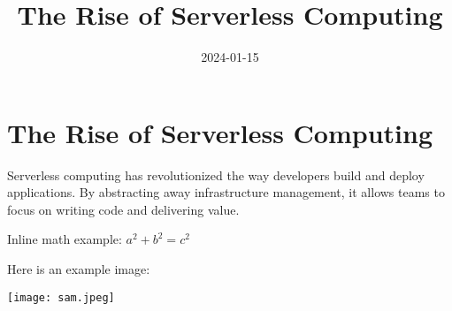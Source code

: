 \title{The Rise of Serverless Computing}
\date{2024-01-15}

\section*{The Rise of Serverless Computing}

Serverless computing has revolutionized the way developers build and deploy applications. By abstracting away infrastructure management, it allows teams to focus on writing code and delivering value.

Inline math example: $a^2 + b^2 = c^2$

Here is an example image:

\texttt{[image: sam.jpeg]}